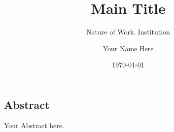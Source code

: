 \documentclass{scrreprt}
\title{Main Title}
\subtitle{Nature of Work. Institution}
\author{Your Name Here}
\date{\today}
\newcommand*{\RootPath}{../}
\begin{document}
\begin{spacing}{1}
	\maketitle 
\end{spacing}
\tableofcontents

\subsection*{Abstract}
Your Abstract here.




\begin{appendices}
	
\end{appendices}

\newpage
\listoffigures    
\listoftables
\printbibliography
\end{document}
